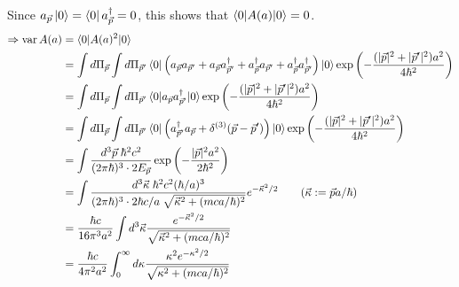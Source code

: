 \documentclass[11pt]{article}
\begin{document}
Since $a_{\vec{p}}\ket{0} = \bra{0} a_{\vec{p}}^\dagger = 0$,
this shows that $\braket{0 | A(a) | 0} = 0$.
\begin{align*}
    \Rightarrow \operatorname{var} A(a)
    &= \braket{0 | A(a)^2 | 0} \\
    &= \int d\Pi_{\vec{p}} \int d\Pi_{\vec{p}'}
        \braket{0 | \left(
            a_{\vec{p}}a_{\vec{p}'}
            + a_{\vec{p}}a_{\vec{p}'}^\dagger
            + a_{\vec{p}}^\dagger a_{\vec{p}'}
            + a_{\vec{p}}^\dagger a_{\vec{p}'}^\dagger
        \right) | 0} \exp \left(
            -\frac{(|\vec{p}|^2 + |\vec{p}'|^2)a^2}{4\hbar^2}
        \right) \\
    &= \int d\Pi_{\vec{p}} \int d\Pi_{\vec{p}'}
        \braket{0 | a_{\vec{p}}a_{\vec{p}'}^\dagger | 0} \exp \left(
            -\frac{(|\vec{p}|^2 + |\vec{p}'|^2)a^2}{4\hbar^2}
        \right) \\
    &= \int d\Pi_{\vec{p}} \int d\Pi_{\vec{p}'}
        \braket{0 | \left(
            a_{\vec{p}'}^\dagger a_{\vec{p}}
            + \delta^{(3)}(\vec{p} - \vec{p}')
        \right) | 0} \exp \left(
            -\frac{(|\vec{p}|^2 + |\vec{p}'|^2)a^2}{4\hbar^2}
        \right) \\
    &= \int\frac{d^3\vec{p}\; \hbar^2 c^2}{(2\pi\hbar)^3 \cdot 2E_{\vec{p}}}
        \exp\left(-\frac{|\vec{p}|^2 a^2}{2\hbar^2}\right) \\
    &= \int\frac{
        d^3\vec{\kappa}\; \hbar^2 c^2 (\hbar/a)^3
    }{
        (2\pi\hbar)^3 \cdot 2\hbar c / a \; \sqrt{\vec{\kappa}^2 + (mca/\hbar)^2}
    } e^{-\vec{\kappa}^2/2}
            \qquad (\vec{\kappa} := \vec{p}a / \hbar) \\
    &= \frac{\hbar c}{16\pi^3 a^2} \int d^3\vec{\kappa}
        \frac{e^{-\vec{\kappa}^2/2}}{\sqrt{\vec{\kappa}^2 + (mca/\hbar)^2}} \\
    &= \frac{\hbar c}{4\pi^2 a^2} \int_0^\infty d\kappa
        \frac{\kappa^2 e^{-\kappa^2/2}}{\sqrt{\kappa^2 + (mca/\hbar)^2}}
\end{align*}
\end{document}
